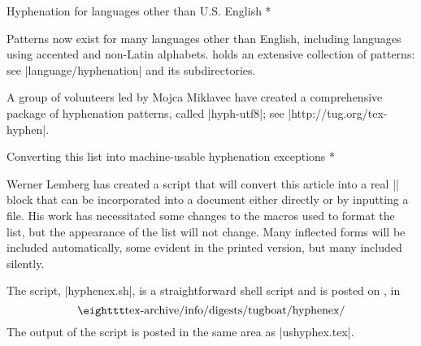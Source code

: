 \head * Hyphenation for languages \break other than U.S. English *

Patterns now exist for many languages other than  English,
including languages using accented and non-Latin alphabets.
{\CTAN} holds an extensive collection of patterns: see
|language/hyphenation| and its subdirectories.

A group of volunteers led by Mojca Miklavec have created a comprehensive
package of hyphenation patterns, called |hyph-utf8|; see\newline
|http://tug.org/tex-hyphen|.

\head * Converting this list into machine-usable \break hyphenation exceptions *

Werner Lemberg has created a script that will convert this article into
a real |\hyphenation| block that can be incorporated into a document
either directly or by inputting a file.  His work has necessitated
some changes to the macros used to format the list, but the appearance
of the list will not change.  Many inflected forms will be included
automatically, some evident in the printed version, but many included
silently.

The script, |hyphenex.sh|, is a straightforward shell script and is
posted on \CTAN, in
$$\hbox{\tt tex-archive/info/digests/tugboat/hyphenex/}$$
The output of the script is posted in the same area as |ushyphex.tex|.



\def\printhyphens#1{%
 \setbox0\vbox{%
  \pretolerance-1\hyphenpenalty-10000%
  \hsize0pt\leftskip0pt\rightskip0pt\parfillskip0pt%
  \hbadness100\hfuzz\maxdimen
  \offinterlineskip
  \interlinepenalty0\clubpenalty0\widowpenalty0\brokenpenalty0%
  \noindent\hskip0pt #1\par
  \setbox0\lastbox \global\setbox1\hbox{\hbox{\unhbox0}}%
  \loop \unskip \setbox0\lastbox \ifhbox0%
   \global\setbox1\hbox{\hbox{\unhbox0}\discretionary{}{}{}\unhbox1}%
  \repeat}%
}

